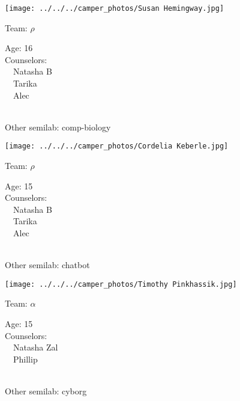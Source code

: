 \documentclass[10pt,letterpaper, landscape]{article}
\begin{document}
\horizontalshiftfornextsticker
\renewcommand{\baselinestretch}{1} \begin{sticker}
\noindent\begin{minipage}{0.5\textwidth}\texttt{[image: ../../../camper\_photos/Susan Hemingway.jpg]}\end{minipage}\begin{minipage}{0.45\textwidth}
Team: {\Large $\rho$}

Age:        16\\
Counselors: \\\ \ Natasha B\\\ \ Tarika\\\ \ Alec\\
\end{minipage} \\ \vspace{0.07in}
Other semilab: comp-biology
\end{sticker}
\horizontalshiftfornextsticker
\renewcommand{\baselinestretch}{1} \begin{sticker}
\noindent\begin{minipage}{0.5\textwidth}\texttt{[image: ../../../camper\_photos/Cordelia Keberle.jpg]}\end{minipage}\begin{minipage}{0.45\textwidth}
Team: {\Large $\rho$}

Age:        15\\
Counselors: \\\ \ Natasha B\\\ \ Tarika\\\ \ Alec\\
\end{minipage} \\ \vspace{0.07in}
Other semilab: chatbot
\end{sticker}
\horizontalshiftfornextsticker
\renewcommand{\baselinestretch}{1} \begin{sticker}
\noindent\begin{minipage}{0.5\textwidth}\texttt{[image: ../../../camper\_photos/Timothy Pinkhassik.jpg]}\end{minipage}\begin{minipage}{0.45\textwidth}
Team: {\Large $\alpha$}

Age:        15\\
Counselors: \\\ \ Natasha Zal\\\ \ Phillip\\
\end{minipage} \\ \vspace{0.07in}
Other semilab: cyborg
\end{sticker}
\end{document}
